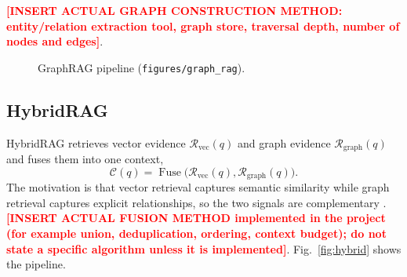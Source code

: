 \documentclass[conference]{IEEEtran}
\newcommand{\ph}[1]{\textbf{\textcolor{red}{[#1]}}}
\begin{document}
\ph{INSERT ACTUAL GRAPH CONSTRUCTION METHOD: entity/relation extraction tool, graph store, traversal depth, number of nodes and edges}.

\begin{figure}[t]
\centering
{}
\caption{GraphRAG pipeline (\texttt{figures/graph\_rag}).}
\label{fig:graph}
\end{figure}

\subsection{HybridRAG}
HybridRAG retrieves vector evidence $\mathcal{R}_{\text{vec}}(q)$ and graph evidence $\mathcal{R}_{\text{graph}}(q)$ and fuses them into one context,
\begin{equation}
\mathcal{C}(q)=\operatorname{Fuse}\big(\mathcal{R}_{\text{vec}}(q),\mathcal{R}_{\text{graph}}(q)\big).
\label{eq:fuse}
\end{equation}
The motivation is that vector retrieval captures semantic similarity while graph retrieval captures explicit relationships, so the two signals are complementary \cite{sarmah2024hybridrag,ghanadian2026base}. \ph{INSERT ACTUAL FUSION METHOD implemented in the project (for example union, deduplication, ordering, context budget); do not state a specific algorithm unless it is implemented}. Fig.~\ref{fig:hybrid} shows the pipeline.
\end{document}
